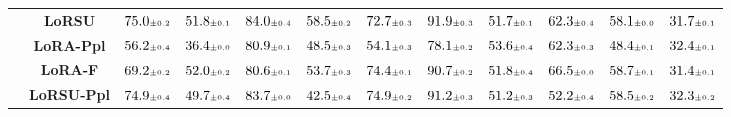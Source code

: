 \begin{table}
\begin{center}
\begin{small}
\begin{tabular}{l c c c c c c c c c c c}
& \textbf{LoRSU} & $75.0 \mtiny{\pm 0.2}$ & $51.8 \mtiny{\pm 0.1}$ & $84.0 \mtiny{\pm 0.4}$ & $58.5 \mtiny{\pm 0.2}$ & $72.7 \mtiny{\pm 0.3}$ & $91.9 \mtiny{\pm 0.3}$ & $51.7 \mtiny{\pm 0.1}$ & $62.3 \mtiny{\pm 0.4}$ & $58.1 \mtiny{\pm 0.0}$ & $31.7 \mtiny{\pm 0.1}$ \\
& \textbf{LoRA-Ppl} & $56.2 \mtiny{\pm 0.4}$ & $36.4 \mtiny{\pm 0.0}$ & $80.9 \mtiny{\pm 0.1}$ & $48.5 \mtiny{\pm 0.3}$ & $54.1 \mtiny{\pm 0.3}$ & $78.1 \mtiny{\pm 0.2}$ & $53.6 \mtiny{\pm 0.4}$ & $62.3 \mtiny{\pm 0.3}$ & $48.4 \mtiny{\pm 0.1}$ & $32.4 \mtiny{\pm 0.1}$ \\
& \textbf{LoRA-F} & $69.2 \mtiny{\pm 0.2}$ & $52.0 \mtiny{\pm 0.2}$ & $80.6 \mtiny{\pm 0.1}$ & $53.7 \mtiny{\pm 0.3}$ & $74.4 \mtiny{\pm 0.1}$ & $90.7 \mtiny{\pm 0.2}$ & $51.8 \mtiny{\pm 0.4}$ & $66.5 \mtiny{\pm 0.0}$ & $58.7 \mtiny{\pm 0.1}$ & $31.4 \mtiny{\pm 0.1}$ \\
& \textbf{LoRSU-Ppl} & $74.9 \mtiny{\pm 0.4}$ & $49.7 \mtiny{\pm 0.4}$ & $83.7 \mtiny{\pm 0.0}$ & $42.5 \mtiny{\pm 0.4}$ & $74.9 \mtiny{\pm 0.2}$ & $91.2 \mtiny{\pm 0.3}$ & $51.2 \mtiny{\pm 0.3}$ & $52.2 \mtiny{\pm 0.4}$ & $58.5 \mtiny{\pm 0.2}$ & $32.3 \mtiny{\pm 0.2}$ \\
\bottomrule
\end{tabular}
\endgroup
\end{small}
\end{center}
\vskip -0.1in
\end{table}


